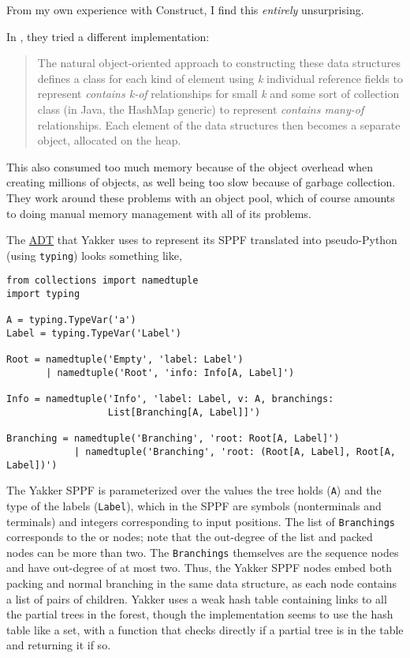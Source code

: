 \documentclass[12pt]{article}
\begin{document}
From my own experience with Construct, I find this \emph{entirely}
unsurprising.

In \textcite{gll3}, they tried a different implementation:

\begin{quote}
  The natural object-oriented approach to constructing these data
  structures defines a class for each kind of element using \emph{k}
  individual reference fields to represent \emph{contains k-of}
  relationships for small \emph{k} and some sort of collection class
  (in Java, the HashMap generic) to represent \emph{contains many-of}
  relationships. Each element of the data structures then becomes a
  separate object, allocated on the heap.
\end{quote}

This also consumed too much memory because of the object overhead when
creating millions of objects, as well being too slow because of
garbage collection.  They work around these problems with an object
pool, which of course amounts to doing manual memory management with
all of its problems.

The
\href{https://github.com/yitzhakm/yakker/blob/master/src/history.ml}{ADT}
that Yakker uses to represent its SPPF translated into pseudo-Python
(using \texttt{typing}) looks something like,

\begin{lstlisting}
from collections import namedtuple
import typing

A = typing.TypeVar('a')
Label = typing.TypeVar('Label')

Root = namedtuple('Empty', 'label: Label')
       | namedtuple('Root', 'info: Info[A, Label]')

Info = namedtuple('Info', 'label: Label, v: A, branchings:
                  List[Branching[A, Label]]')

Branching = namedtuple('Branching', 'root: Root[A, Label]')
            | namedtuple('Branching', 'root: (Root[A, Label], Root[A, Label])')

\end{lstlisting}

The Yakker SPPF is parameterized over the values the tree holds
(\texttt{A}) and the type of the labels (\texttt{Label}), which in the
\textcite{gll2} SPPF are symbols (nonterminals and terminals) and
integers corresponding to input positions.  The list of
\texttt{Branchings} corresponds to the or nodes; note that the
out-degree of the list and packed nodes can be more than two.  The
\texttt{Branchings} themselves are the sequence nodes and have
out-degree of at most two.  Thus, the Yakker SPPF nodes embed both
packing and normal branching in the same data structure, as each node
contains a list of pairs of children.  Yakker uses a weak hash table
containing links to all the partial trees in the forest, though the
implementation seems to use the hash table like a set, with a function
that checks directly if a partial tree is in the table and returning
it if so.
\end{document}

